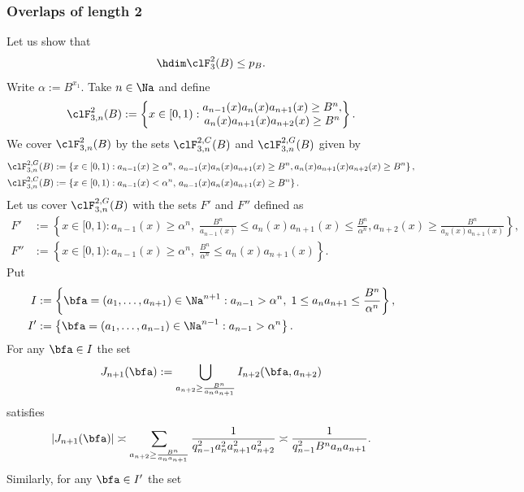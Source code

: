 \documentclass[12pt,a4paper]{amsart}
\begin{document}
\subsubsection{Overlaps of length 2}
Let us show that 
\begin{equation}\label{Eq:hdim:clF31}
\hdim \clF_{3}^{2}(B) \leq p_B.
\end{equation}
Write $\alpha:=B^{x_1}$. Take $n\in\Na$ and define
\[
\clF_{3,n}^{2}(B)
:=
\left\{ x\in [0,1): 
\begin{matrix}
a_{n-1}(x)a_{n}(x)a_{n+1}(x) \geq B^n, \\
a_{n}(x)a_{n+1}(x)a_{n+2}(x) \geq B^n 
\end{matrix}
\right\}.
\]
We cover $\clF_{3,n}^{2}(B)$ by the sets $\clF_{3,n}^{2,C}(B)$ and $\clF_{3,n}^{2,G}(B)$ given by 
\begin{align*}
\clF_{3,n}^{2,G}(B)
&:=
\left\{ x\in [0,1): a_{n-1}(x) \geq \alpha^n, \, a_{n-1}(x)a_{n}(x) a_{n+1}(x)  \geq B^n, a_{n}(x) a_{n+1}(x) a_{n+2}(x)  \geq B^n \right\}, \\
\clF_{3,n}^{2,C}(B)
&:=
\left\{ x\in [0,1): a_{n-1}(x)< \alpha^n, \, a_{n-1}(x) a_{n}(x) a_{n+1}(x)  \geq B^n \right\}.
\end{align*}
Let us cover $\clF_{3,n}^{2,G}(B)$ with the sets $F'$ and $F''$ defined as 
\begin{align*}
F' &:=
\left\{ x\in [0,1): a_{n-1}(x) \geq \alpha^n, \; \frac{B^n}{a_{n-1}(x)} \leq a_{n}(x) a_{n+1}(x) \leq \frac{B^n}{\alpha^n}, a_{n+2}(x) \geq \frac{B^n}{a_n(x)a_{n+1}(x)} \right\}, \\
F'' &:=
\left\{ x\in [0,1): a_{n-1}(x)\geq \alpha^n, \; \frac{B^n}{\alpha^n} \leq a_{n}(x) a_{n+1}(x) \right\}.
\end{align*}
Put
\begin{align*}
I&:=
\left\{
\bfa=(a_1,\ldots, a_{n+1})\in\Na^{n+1}: a_{n-1}> \alpha^n, \; 1\leq a_n a_{n+1} \leq \frac{B^n}{\alpha^n}\right\}, \\
I' &:=
\left\{
\bfa=(a_1,\ldots, a_{n-1})\in\Na^{n-1}: a_{n-1}> \alpha^n \right\}.
\end{align*}
For any $\bfa\in I$ the set
\[
J_{n+1}(\bfa):
=
\bigcup_{a_{n+2}\geq \frac{B^n}{a_na_{n+1}}} I_{n+2}(\bfa, a_{n+2})
\]
satisfies
\begin{equation}\label{Eq:UpperBound:a}
|J_{n+1}(\bfa)|
\asymp
\sum_{a_{n+2}\geq \frac{B^n}{a_na_{n+1}}} 
\frac{1}{q_{n-1}^2 a_{n}^2a_{n+1}^2 a_{n+2}^2}
\asymp
\frac{1}{q_{n-1}^2 B^n a_{n}a_{n+1}}.
\end{equation}
Similarly, for any $\bfa\in I'$ the set
\end{document}
